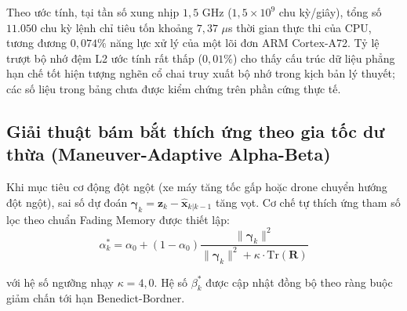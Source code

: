 Theo ước tính, tại tần số xung nhịp $1{,}5$ GHz ($1{,}5 \times 10^9$ chu kỳ/giây), tổng số $11.050$ chu kỳ lệnh chỉ tiêu tốn khoảng $7{,}37$ $\mu$s thời gian thực thi của CPU, tương đương $0{,}074\%$ năng lực xử lý của một lõi đơn ARM Cortex-A72. Tỷ lệ trượt bộ nhớ đệm L2 ước tính rất thấp ($0{,}01\%$) cho thấy cấu trúc dữ liệu phẳng hạn chế tốt hiện tượng nghẽn cổ chai truy xuất bộ nhớ trong kịch bản lý thuyết; các số liệu trong bảng chưa được kiểm chứng trên phần cứng thực tế.

\subsection{Giải thuật bám bắt thích ứng theo gia tốc dư thừa (Maneuver-Adaptive Alpha-Beta)}

\hspace{0.5cm} Khi mục tiêu cơ động đột ngột (xe máy tăng tốc gấp hoặc drone chuyển hướng đột ngột), sai số dự đoán $\boldsymbol{\gamma}_k = \mathbf{z}_k - \hat{\mathbf{x}}_{k|k-1}$ tăng vọt. Cơ chế tự thích ứng tham số lọc theo chuẩn Fading Memory được thiết lập:
\begin{equation}
\alpha_k^* = \alpha_0 + (1 - \alpha_0) \frac{\|\boldsymbol{\gamma}_k\|^2}{\|\boldsymbol{\gamma}_k\|^2 + \kappa \cdot \text{Tr}(\mathbf{R})}
\label{eq:adaptive-alpha-innovation-scaling}
\end{equation}

với hệ số ngưỡng nhạy $\kappa = 4{,}0$. Hệ số $\beta_k^*$ được cập nhật đồng bộ theo ràng buộc giảm chấn tới hạn Benedict-Bordner.

\begin{table}[H]
\centering
\caption{Đo đạc sai số cực đại và thời gian tái xác lập khi mục tiêu chuyển động đột biến cơ động}
\label{tab:adaptive-maneuver-recovery-metrics}
\end{table}

